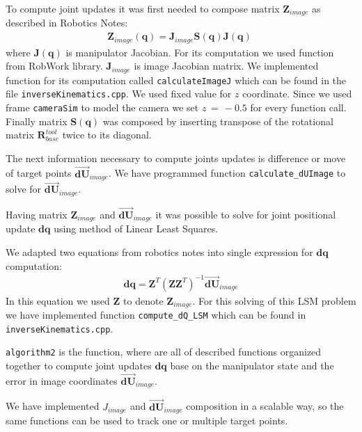 \documentclass[]{scrartcl}
\begin{document}
To compute joint updates it was first needed to compose matrix $\boldsymbol{Z}_{image}$ as described in Robotics Notes:
\begin{align}
	\boldsymbol{Z}_{image}(\boldsymbol{q}) = \boldsymbol{J}_{image}\boldsymbol{S}(\boldsymbol{q})\boldsymbol{J}(\boldsymbol{q})\; 
\end{align}
where $\boldsymbol{J}(\boldsymbol{q})$ is manipulator Jacobian. For its computation we used function from RobWork library. $\boldsymbol{J}_{image}$ is image Jacobian matrix. We implemented function for its computation called \texttt{calculateImageJ} which can be found in the file \texttt{inverseKinematics.cpp}. We used fixed value for $z$ coordinate. Since we used frame \texttt{cameraSim} to model the camera we set $z\, = \, -0.5$ for every function call. Finally matrix $\boldsymbol{S}(\boldsymbol{q})$ was composed by inserting transpose of the rotational matrix $\boldsymbol{R}_{base}^{tool}$ twice to its diagonal.

The next information necessary to compute joints updates is difference or move of target points $\overrightarrow{\boldsymbol{dU}}_{image}$. We have programmed function \texttt{calculate\_dUImage} to solve for $\overrightarrow{\boldsymbol{dU}}_{image}$.

Having matrix $\boldsymbol{Z}_{image}$ and $\overrightarrow{\boldsymbol{dU}}_{image}$ it was possible to solve for joint positional update ${\boldsymbol{dq}}$ using method of Linear Least Squares.

We adapted two equations from robotics notes into single expression for ${\boldsymbol{dq}}$ computation:
\begin{align}
	\boldsymbol{dq} = \boldsymbol{Z}^T\left(\boldsymbol{Z}\boldsymbol{Z}^T\right)^{-1} \overrightarrow{\boldsymbol{dU}}_{image}
\end{align}
In this equation we used $\boldsymbol{Z}$ to denote $\boldsymbol{Z}_{image}$.
For this solving of this LSM problem we have implemented function \texttt{compute\_dQ\_LSM} which can be found in \texttt{inverseKinematics.cpp}.

\texttt{algorithm2} is the function, where are all of described functions organized together to compute joint updates $\boldsymbol{dq}$ base on the manipulator state and the error in image coordinates $\overrightarrow{\boldsymbol{dU}}_{image}$.

We have implemented $J_{image}$ and $\overrightarrow{\boldsymbol{dU}}_{image}$ composition in a scalable way, so the same functions can be used to track one or multiple target points.
\end{document}
